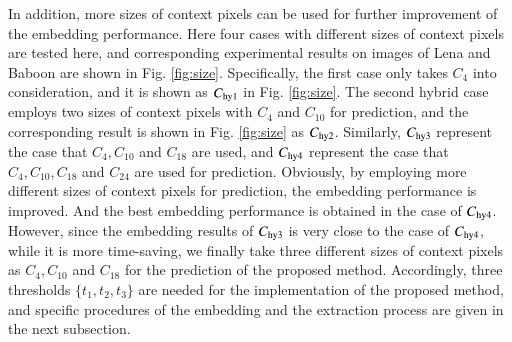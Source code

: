 \documentclass[review,3p,10pt,sort&compress]{elsarticle}
\begin{document}
In addition, more sizes of context pixels can be used for further improvement of the embedding performance. Here four cases with different sizes of context pixels are tested here, and corresponding experimental results on images of Lena and Baboon are shown in Fig. \ref{fig:size}. Specifically, the first case only takes $C_4$ into consideration, and it is shown as $C_{\rm hy1}$ in Fig. \ref{fig:size}. The second hybrid case employs two sizes of context pixels with $C_4$ and $C_{10}$ for prediction, and the corresponding result is shown in Fig. \ref{fig:size} as $C_{\rm hy2}$. Similarly, $C_{\rm hy3}$ represent the case that $C_4, C_{10}$ and $C_{18}$ are used, and $C_{\rm hy4}$ represent the case that $C_4, C_{10}, C_{18}$ and $C_{24}$ are used for prediction. Obviously, by employing more different sizes of context pixels for prediction, the embedding performance is improved. And the best embedding performance is obtained in the case of $C_{\rm hy4}$. However, since the embedding results of $C_{\rm hy3}$ is very close to the case of $C_{\rm hy4}$, while it is more time-saving, we finally take three different sizes of context pixels as $C_4, C_{10}$ and $C_{18}$ for the prediction of the proposed method. Accordingly, three thresholds $\{t_1, t_2, t_3\}$ are needed for the implementation of the proposed method, and specific procedures of the embedding and the extraction process are given in the next subsection.
\end{document}
